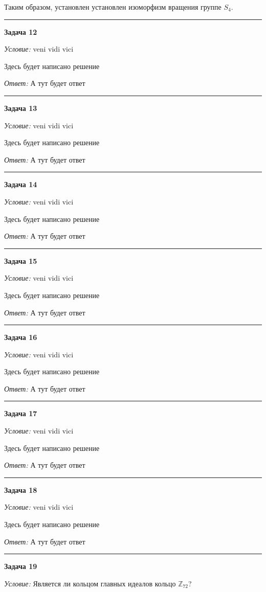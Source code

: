 \documentclass[12pt,a4paper]{article}
\newcommand{\sbs}{\large \bfseries}
\newcommand{\rl}{\vspace{16pt} \hrule \vspace{8pt}}
\begin{document}
Таким образом, установлен установлен изоморфизм вращения группе $S_4$.




\rl
{\sbs Задача 12}

{\itshape Условие: } veni vidi vici

Здесь будет написано решение

{\itshape Ответ: } А тут будет ответ




\rl
{\sbs Задача 13}

{\itshape Условие: } veni vidi vici

Здесь будет написано решение

{\itshape Ответ: } А тут будет ответ




\rl
{\sbs Задача 14}

{\itshape Условие: } veni vidi vici

Здесь будет написано решение

{\itshape Ответ: } А тут будет ответ




\rl
{\sbs Задача 15}

{\itshape Условие: } veni vidi vici

Здесь будет написано решение

{\itshape Ответ: } А тут будет ответ




\rl
{\sbs Задача 16}

{\itshape Условие: } veni vidi vici

Здесь будет написано решение

{\itshape Ответ: } А тут будет ответ




\rl
{\sbs Задача 17}

{\itshape Условие: } veni vidi vici

Здесь будет написано решение

{\itshape Ответ: } А тут будет ответ




\rl
{\sbs Задача 18}

{\itshape Условие: } veni vidi vici

Здесь будет написано решение

{\itshape Ответ: } А тут будет ответ




\rl
{\sbs Задача 19}

{\itshape Условие: } Является ли кольцом главных идеалов кольцо $\mathds{Z}_{72}$?
\end{document}
